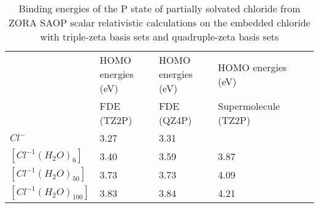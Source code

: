 \documentclass[a4paper,11pt]{report}
\begin{document}
\begin{table}[H]\small
\begin{center}
\caption{Binding energies of the P state of partially solvated chloride from ZORA SAOP scalar relativistic calculations on the embedded chloride with triple-zeta basis sets and quadruple-zeta basis sets} \label{tab:1}
\begin{tabular}{|l|l|l|l|l|l|}
\hline
&HOMO energies (eV)&HOMO energies (eV)&HOMO energies (eV)\\
&\hspace*{0.5cm}FDE (TZ2P)&\hspace*{0.5cm}FDE (QZ4P)&\hspace*{0.3cm}Supermolecule (TZ2P)\\ 
\hline
$Cl^{-}$&\hspace*{1.0cm}3.27&\hspace*{1.0cm}3.31&\\
\hline
$[Cl^{-1}(H_{2}O)_{6}]$&\hspace*{1.0cm}3.40&\hspace*{1.0cm}3.59&\hspace*{1.0cm}3.87\\
\hline
$[Cl^{-1}(H_{2}O)_{50}]$&\hspace*{1.0cm}3.73&\hspace*{1.0cm}3.73&\hspace*{1.0cm}4.09\\
\hline
$[Cl^{-1}(H_{2}O)_{100}]$&\hspace*{1.0cm}3.83&\hspace*{1.0cm}3.84&\hspace*{1.0cm}4.21\\
\hline
\end{tabular}
\label{table1}
\end{center}
\end{table}
\end{document}
